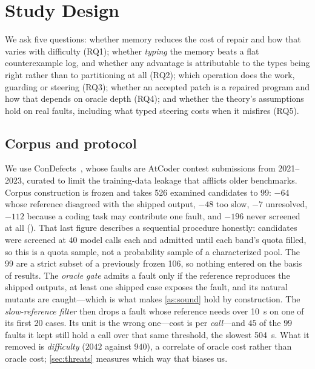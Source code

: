 \section{Study Design}
\label{sec:design}

We ask five questions: whether memory reduces the cost of repair and how that
varies with difficulty (RQ1); whether \emph{typing} the memory beats a flat
counterexample log, and whether any advantage is attributable to the types
being right rather than to partitioning at all (RQ2); which operation does the
work, guarding or steering (RQ3); whether an accepted patch is a repaired
program and how that depends on oracle depth (RQ4); and whether the theory's
assumptions hold on real faults, including what typed steering costs when it
misfires (RQ5).

\subsection{Corpus and protocol}
We use ConDefects~\cite{wu2024condefects}, whose faults are AtCoder contest
submissions from 2021--2023, curated to limit the training-data leakage that
afflicts older benchmarks. Corpus construction is frozen and takes \num{526}
examined candidates to \num{99}: $-64$ whose reference disagreed with the
shipped output, $-48$ too slow, $-7$ unresolved, $-112$ because a coding task
may contribute one fault, and $-196$ never screened at all
(). That last figure describes a
sequential procedure honestly: candidates were screened at $40$ model calls
each and admitted until each band's quota filled, so this is a quota sample,
not a probability sample of a characterized pool. The \num{99} are a strict
subset of a previously frozen \num{106}, so nothing entered on the basis of
results. The \emph{oracle gate} admits a fault only if the reference reproduces
the shipped outputs, at least one shipped case exposes the fault, and its
natural mutants are caught---which is what makes \cref{as:sound} hold by
construction. The \emph{slow-reference filter} then drops a fault whose
reference needs over \SI{10}{\second} on one of its first $20$ cases. Its unit
is the wrong one---cost is per \emph{call}---and $45$ of the $99$ faults it
kept still hold a call over that same threshold, the slowest
\SI{504}{\second}. What it removed is \emph{difficulty} ($2042$ against $940$),
a correlate of oracle cost rather than oracle cost;
\cref{sec:threats} measures which way that biases us.

\ifsuppmatter\else\fi

